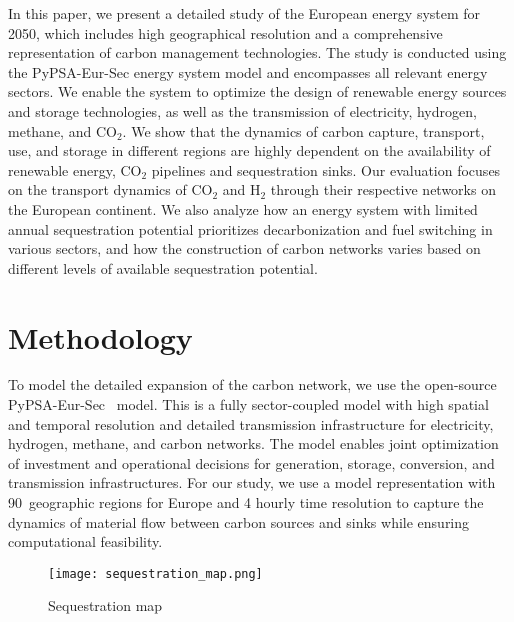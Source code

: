 \documentclass[conference]{IEEEtran}
\newcommand{\carbon}{CO$_2$}
\newcommand{\hydrogen}{H$_2$}
\begin{document}
In this paper, we present a detailed study of the European energy system for 2050, which includes high geographical resolution and a comprehensive representation of carbon management technologies. The study is conducted using the PyPSA-Eur-Sec energy system model and encompasses all relevant energy sectors. We enable the system to optimize the design of renewable energy sources and storage technologies, as well as the transmission of electricity, hydrogen, methane, and \carbon{}. We show that the dynamics of carbon capture, transport, use, and storage in different regions are highly dependent on the availability of renewable energy, \carbon{} pipelines and sequestration sinks. Our evaluation focuses on the transport dynamics of \carbon{} and \hydrogen{} through their respective networks on the European continent. We also analyze how an energy system with limited annual sequestration potential prioritizes decarbonization and fuel switching in various sectors, and how the construction of carbon networks varies based on different levels of available sequestration potential.


\section{Methodology}
\label{sec:methodology}

To model the detailed expansion of the carbon network, we use the open-source PyPSA-Eur-Sec~\cite{PyPSAEurSecSectorCoupledOpen2023} model. This is a fully sector-coupled model with high spatial and temporal resolution and detailed transmission infrastructure for electricity, hydrogen, methane, and carbon networks. The model enables joint optimization of investment and operational decisions for generation, storage, conversion, and transmission infrastructures. For our study, we use a model representation with 90~geographic regions for Europe and 4 hourly time resolution to capture the dynamics of material flow between carbon sources and sinks while ensuring computational feasibility.


\begin{figure}[h]
    \centering
    \texttt{[image: sequestration\_map.png]}
    \caption{Sequestration map}
    \label{fig:sequestration_map}
\end{figure}
\end{document}
